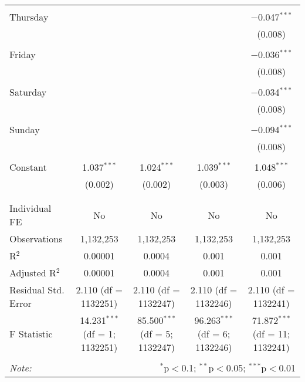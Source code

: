 \documentclass[
]{article}
\begin{document}
\begin{table}[!htbp]
{\begin{tabular}{@{\extracolsep{5pt}}lcccc}
  & & & & \\ 
 Thursday &  &  &  & $-$0.047$^{***}$ \\ 
  &  &  &  & (0.008) \\ 
  & & & & \\ 
 Friday &  &  &  & $-$0.036$^{***}$ \\ 
  &  &  &  & (0.008) \\ 
  & & & & \\ 
 Saturday &  &  &  & $-$0.034$^{***}$ \\ 
  &  &  &  & (0.008) \\ 
  & & & & \\ 
 Sunday &  &  &  & $-$0.094$^{***}$ \\ 
  &  &  &  & (0.008) \\ 
  & & & & \\ 
 Constant & 1.037$^{***}$ & 1.024$^{***}$ & 1.039$^{***}$ & 1.048$^{***}$ \\ 
  & (0.002) & (0.002) & (0.003) & (0.006) \\ 
  & & & & \\ 
\hline \\[-1.8ex] 
Individual FE & No & No & No & No \\ 
Observations & 1,132,253 & 1,132,253 & 1,132,253 & 1,132,253 \\ 
R$^{2}$ & 0.00001 & 0.0004 & 0.001 & 0.001 \\ 
Adjusted R$^{2}$ & 0.00001 & 0.0004 & 0.001 & 0.001 \\ 
Residual Std. Error & 2.110 (df = 1132251) & 2.110 (df = 1132247) & 2.110 (df = 1132246) & 2.110 (df = 1132241) \\ 
F Statistic & 14.231$^{***}$ (df = 1; 1132251) & 85.500$^{***}$ (df = 5; 1132247) & 96.263$^{***}$ (df = 6; 1132246) & 71.872$^{***}$ (df = 11; 1132241) \\ 
\hline 
\hline \\[-1.8ex] 
\textit{Note:}  & \multicolumn{4}{r}{$^{*}$p$<$0.1; $^{**}$p$<$0.05; $^{***}$p$<$0.01} \\ 
\end{tabular}
} 
\end{table} 
\newpage
\end{document}
